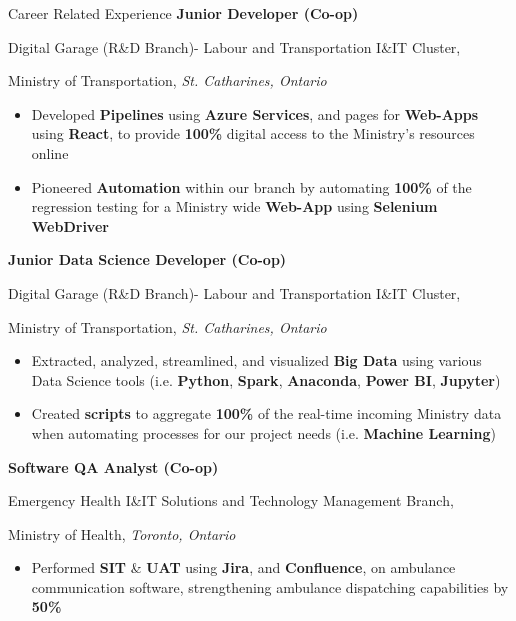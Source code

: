 \begin{rubric}{Career Related Experience}
%
	\textbf{Junior Developer (Co-op)}
	\par Digital Garage (R\&D Branch)- Labour and Transportation I\&IT Cluster,
	\par Ministry of Transportation, \emph{ St. Catharines, Ontario}%
	\begin{itemize}\vspace{-2mm}
     \item Developed \textbf{Pipelines} using \textbf{Azure Services}, and pages for \textbf{Web-Apps} using \textbf{React}, to provide \textbf{100\%} digital access to the Ministry's resources online
     \vspace{-2mm}
     \item Pioneered \textbf{Automation} within our branch by automating \textbf{100\%} of the regression testing for a Ministry wide \textbf{Web-App} using \textbf{Selenium WebDriver}
    \end{itemize}
%
\renewcommand{\arraystretch}{-2}
%
	\textbf{Junior Data Science Developer (Co-op)}
	\par Digital Garage (R\&D Branch)- Labour and Transportation I\&IT Cluster,
	\par Ministry of Transportation, \emph{ St. Catharines, Ontario}%
	\begin{itemize}\vspace{-2mm}
     \item Extracted, analyzed, streamlined, and visualized \textbf{Big Data} using various Data Science tools (i.e. \textbf{Python}, \textbf{Spark}, \textbf{Anaconda}, \textbf{Power BI}, \textbf{Jupyter})
     \vspace{-2mm}
     \item Created \textbf{scripts} to aggregate \textbf{100\%} of the real-time incoming Ministry data when automating processes for our project needs (i.e. \textbf{Machine Learning})
    \end{itemize}
%
%
	\textbf{Software QA Analyst (Co-op)}
	\par Emergency Health I\&IT Solutions and Technology Management Branch,
	\par Ministry of Health, \emph{Toronto, Ontario}%
	\begin{itemize}\vspace{-2mm}
     \item Performed \textbf{SIT} \& \textbf{UAT} using \textbf{Jira}, and \textbf{Confluence}, on ambulance communication software, strengthening ambulance dispatching capabilities by  \textbf{50\%}

\end{itemize}
\end{rubric}
